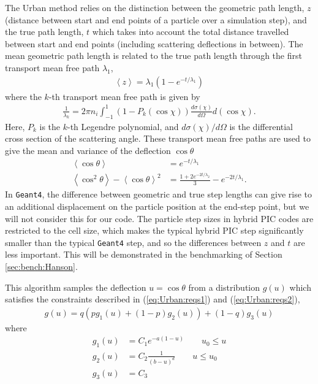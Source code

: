 \documentclass[12pt]{article}
\numberwithin{equation}{section}
\begin{document}
The Urban method relies on the distinction between the geometric path length, $z$ (distance between start and end points of a particle over a simulation step), and the true path length, $t$ which takes into account the total distance travelled between start and end points (including scattering deflections in between). The mean geometric path length is related to the true path length through the first transport mean free path $\lambda_1$,
%
\begin{align}
  \left\langle z \right\rangle = \lambda_1 \left(1-e^{-t/\lambda_1}\right)
\end{align}
%
where the $k$-th transport mean free path is given by
%
\begin{align} 
  \frac{1}{\lambda_k} = 2\pi n_i \int_{-1}^1(1-P_k(\cos{\chi}))\frac{d\sigma(\chi)}{d\Omega}d(\cos\chi).
\end{align} 
%
Here, $P_k$ is the $k$-th Legendre polynomial, and $d\sigma(\chi)/d\Omega$ is the differential cross section of the scattering angle. These transport mean free paths are used to give the mean and variance of the deflection $\cos\theta$
%
\begin{align} \label{eq:Urban:reqs1}
 \left\langle \cos\theta \right\rangle &= e^{-t/\lambda_1} \\
 \left\langle \cos^2\theta \right\rangle - \left\langle\cos\theta\right\rangle^2 &= \frac{1+2e^{-2t/\lambda_2}}{3} - e^{-2t/\lambda_1}. \label{eq:Urban:reqs2}
\end{align}
%
In \texttt{Geant4}, the difference between geometric and true step lengths can give rise to an additional displacement on the particle position at the end-step point, but we will not consider this for our code. The particle step sizes in hybrid PIC codes are restricted to the cell size, which makes the typical hybrid PIC step significantly smaller than the typical \texttt{Geant4} step, and so the differences between $z$ and $t$ are less important. This will be demonstrated in the benchmarking of Section \ref{sec:bench:Hanson}.

This algorithm samples the deflection $u=\cos\theta$ from a distribution $g(u)$ which satisfies the constraints described in (\ref{eq:Urban:reqs1}) and (\ref{eq:Urban:reqs2}),
%
\begin{align}
  g(u) = q(pg_1(u) + (1-p)g_2(u)) + (1-q)g_3(u)
\end{align}
%
where
%
\begin{align}
    g_1(u) &= C_1 e^{-a(1-u)} \qquad u_0 \leq u  \\
    g_2(u) &= C_2 \frac{1}{(b-u)^d} \qquad u \leq u_0\\
    g_3(u) &= C_3  
\end{align}
\end{document}
